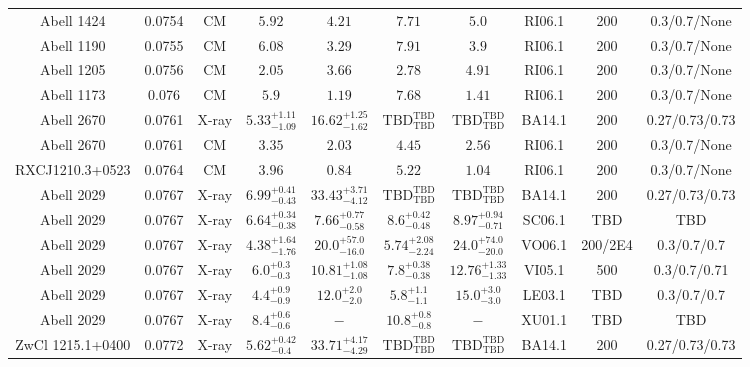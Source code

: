 \begin{table}
\begin{tabular}{cccccccccc}
Abell 1424 & 0.0754 & CM & ${5.92}^{}_{}$ & ${4.21}^{}_{}$ & ${7.71}^{}_{}$ & ${5.0}^{}_{}$ & RI06.1 & 200 & 0.3/0.7/None \\
Abell 1190 & 0.0755 & CM & ${6.08}^{}_{}$ & ${3.29}^{}_{}$ & ${7.91}^{}_{}$ & ${3.9}^{}_{}$ & RI06.1 & 200 & 0.3/0.7/None \\
Abell 1205 & 0.0756 & CM & ${2.05}^{}_{}$ & ${3.66}^{}_{}$ & ${2.78}^{}_{}$ & ${4.91}^{}_{}$ & RI06.1 & 200 & 0.3/0.7/None \\
Abell 1173 & 0.076 & CM & ${5.9}^{}_{}$ & ${1.19}^{}_{}$ & ${7.68}^{}_{}$ & ${1.41}^{}_{}$ & RI06.1 & 200 & 0.3/0.7/None \\
Abell 2670 & 0.0761 & X-ray & ${5.33}^{+1.11}_{-1.09}$ & ${16.62}^{+1.25}_{-1.62}$ & ${\mathrm{TBD}}^{\mathrm{TBD}}_{\mathrm{TBD}}$ & ${\mathrm{TBD}}^{\mathrm{TBD}}_{\mathrm{TBD}}$ & BA14.1 & 200 & 0.27/0.73/0.73 \\
Abell 2670 & 0.0761 & CM & ${3.35}^{}_{}$ & ${2.03}^{}_{}$ & ${4.45}^{}_{}$ & ${2.56}^{}_{}$ & RI06.1 & 200 & 0.3/0.7/None \\
RXCJ1210.3+0523 & 0.0764 & CM & ${3.96}^{}_{}$ & ${0.84}^{}_{}$ & ${5.22}^{}_{}$ & ${1.04}^{}_{}$ & RI06.1 & 200 & 0.3/0.7/None \\
Abell 2029 & 0.0767 & X-ray & ${6.99}^{+0.41}_{-0.43}$ & ${33.43}^{+3.71}_{-4.12}$ & ${\mathrm{TBD}}^{\mathrm{TBD}}_{\mathrm{TBD}}$ & ${\mathrm{TBD}}^{\mathrm{TBD}}_{\mathrm{TBD}}$ & BA14.1 & 200 & 0.27/0.73/0.73 \\
Abell 2029 & 0.0767 & X-ray & ${6.64}^{+0.34}_{-0.38}$ & ${7.66}^{+0.77}_{-0.58}$ & ${8.6}^{+0.42}_{-0.48}$ & ${8.97}^{+0.94}_{-0.71}$ & SC06.1 & TBD & TBD \\
Abell 2029 & 0.0767 & X-ray & ${4.38}^{+1.64}_{-1.76}$ & ${20.0}^{+57.0}_{-16.0}$ & ${5.74}^{+2.08}_{-2.24}$ & ${24.0}^{+74.0}_{-20.0}$ & VO06.1 & 200/2E4 & 0.3/0.7/0.7 \\
Abell 2029 & 0.0767 & X-ray & ${6.0}^{+0.3}_{-0.3}$ & ${10.81}^{+1.08}_{-1.08}$ & ${7.8}^{+0.38}_{-0.38}$ & ${12.76}^{+1.33}_{-1.33}$ & VI05.1 & 500 & 0.3/0.7/0.71 \\
Abell 2029 & 0.0767 & X-ray & ${4.4}^{+0.9}_{-0.9}$ & ${12.0}^{+2.0}_{-2.0}$ & ${5.8}^{+1.1}_{-1.1}$ & ${15.0}^{+3.0}_{-3.0}$ & LE03.1 & TBD & 0.3/0.7/0.7 \\
Abell 2029 & 0.0767 & X-ray & ${8.4}^{+0.6}_{-0.6}$ & ${-}^{}_{}$ & ${10.8}^{+0.8}_{-0.8}$ & ${-}^{}_{}$ & XU01.1 & TBD & TBD \\
ZwCl 1215.1+0400 & 0.0772 & X-ray & ${5.62}^{+0.42}_{-0.4}$ & ${33.71}^{+4.17}_{-4.29}$ & ${\mathrm{TBD}}^{\mathrm{TBD}}_{\mathrm{TBD}}$ & ${\mathrm{TBD}}^{\mathrm{TBD}}_{\mathrm{TBD}}$ & BA14.1 & 200 & 0.27/0.73/0.73 \\

\end{tabular}
\end{table}
